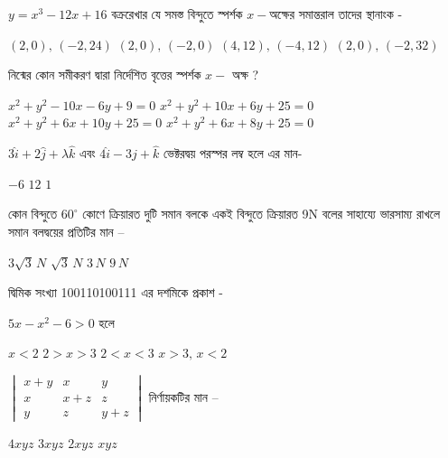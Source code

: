 \documentclass[addpoints]{exam}
\begin{document}
\begin{questions}
\question $ y=x^{3}-12x+16 $ বক্ররেখার যে সমস্ত বিন্দুতে স্পর্শক $ x- $অক্ষের সমান্তরাল তাদের স্থানাংক -

\begin{oneparchoices}
\choice $ (2,0),\,(-2,24) $
\choice $ (2,0),\,(-2,0)$
\choice $ (4,12),\,(-4,12) $
\choice $ (2,0),\,(-2,32) $
\end{oneparchoices}

\question নিন্মের কোন সমীকরণ দ্বারা নির্দেশিত বৃত্তের স্পর্শক $ x-$ অক্ষ ?

\begin{oneparchoices}
\choice $ x^{2}+y^{2}-10x-6y+9=0 $
\choice $ x^{2}+y^{2}+10x+6y+25=0 $
\choice $ x^{2}+y^{2}+6x+10y+25=0 $
\choice $ x^{2}+y^{2}+6x+8y+25=0 $
\end{oneparchoices}

\question $ 3\hat{i}+2\hat{j}+\lambda\hat{k} $ এবং $ 4\hat{i}-3\hat{j}+\hat{k} $ ভেক্টরদ্বয় পরস্পর লম্ব হলে এর মান-

\begin{oneparchoices}
\choice $ -6 $
\choice $ 12 $
\choice $ 1 $
\end{oneparchoices}

\question কোন বিন্দুতে $ 60^{\circ} $ কোণে ক্রিয়ারত দুটি সমান বলকে একই বিন্দুতে ক্রিয়ারত 9N বলের সাহায্যে ভারসাম্য রাখলে সমান বলদ্বয়ের প্রতিটির মান – 

\begin{oneparchoices}
\choice $ 3\sqrt{3}\,N $
\choice $ \sqrt{3}\,N $
\choice $ 3\,N $
\choice $ 9\,N $
\end{oneparchoices}

\question দ্বিমিক সংখ্যা 100110100111 এর দশমিকে প্রকাশ -

\begin{oneparchoices}
\end{oneparchoices}

\question $ 5x-x^{2}-6>0 $ হলে 

\begin{oneparchoices}
\choice $ x<2 $
\choice $ 2>x>3 $
\choice $ 2<x<3 $
\choice $ x>3,\,x<2 $
\end{oneparchoices}

\question   $ \begin{vmatrix}
x+y & x & y \\
x & x+z & z\\
y & z & y+z
\end{vmatrix} $  নির্ণায়কটির মান –

\begin{oneparchoices}
\choice $ 4xyz $
\choice $ 3xyz $
\choice $ 2xyz $
\choice $ xyz $
\end{oneparchoices}


\end{questions}
\end{document}
